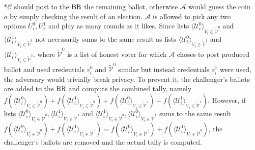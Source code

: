 *$\mathcal{C}$ should post to the $\operatorname{BB}$ the remaining ballot, otherwise  $\mathcal{A}$  would guess the coin $a$ by simply checking the result of an election. $\mathcal{A}$ is allowed to pick any two options $U_i^0,U_i^1$  and play as many rounds as it likes. Since lists $\langle \mathcal{U}^0_i \rangle _{V_i \in \tilde{\mathcal{V}}^0} $ and  $\langle \mathcal{U}^1_i \rangle _{V_i \in \tilde{\mathcal{V}}^1} $  not necessarily  sums to  the same result as lists  $\langle \mathcal{U}^0_i \rangle _{V_i \in \tilde{\mathcal{V}}^1} $ and  $\langle \mathcal{U}^1_i \rangle _{V_i \in \tilde{\mathcal{V}}^0} $, where $ \tilde{\mathcal{V}}^0$ is a list of honest voter for which $\mathcal{A}$ choses to post produced ballot and used credentials $s_i^0$ and $ \tilde{\mathcal{V}}^0$ similar but instead credentials $s_i^1$ were used, the adversary would trivially break privacy. To prevent it, the challenger's ballots are added to the $\operatorname{BB}$ and compute the combined tally, namely $f(\langle \mathcal{U}^0_i \rangle _{V_i \in \tilde{\mathcal{V}}^0} ) + f(\langle \mathcal{U}^1_i \rangle _{V_i \in \tilde{\mathcal{V}}^0} )+ f(\langle \mathcal{U}^0_i \rangle _{V_i \in \tilde{\mathcal{V}}^1} ) +  f(\langle \mathcal{U}^1_i \rangle _{V_i \in \tilde{\mathcal{V}}^1} )$. However, if lists $\langle \mathcal{U}^0_i \rangle _{V_i \in \tilde{\mathcal{V}}^0}, \langle \mathcal{U}^1_i \rangle _{V_i \in \tilde{\mathcal{V}}^1}$ and $\langle \mathcal{U}^1_i \rangle _{V_i \in \tilde{\mathcal{V}}^0}, \langle \mathcal{U}^0_i \rangle _{V_i \in \tilde{\mathcal{V}}^1}$ sums to the same result $f(\langle \mathcal{U}^0_i \rangle _{V_i \in \tilde{\mathcal{V}}^0} ) + f(\langle \mathcal{U}^1_i \rangle _{V_i \in \tilde{\mathcal{V}}^1} ) =  f(\langle \mathcal{U}^0_i \rangle _{V_i \in \tilde{\mathcal{V}}^1} ) +  f(\langle \mathcal{U}^1_i \rangle _{V_i \in \tilde{\mathcal{V}}^0} )$, the challenger's ballots are removed and the actual tally is computed. \\\\
